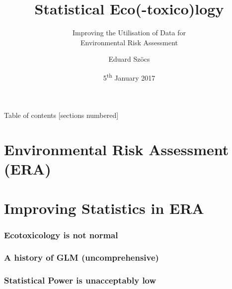 \documentclass[10pt
	]{beamer}
\title{Statistical Eco(-toxico)logy}
\subtitle{Improving the Utilisation of Data for\\Environmental Risk Assessment}
\date{5\textsuperscript{th} January 2017}
\author{Eduard Sz\"{o}cs}
\begin{document}
\maketitle

\begin{frame}{Table of contents}
  [sections numbered]
  \tableofcontents[hideallsubsections]
\end{frame}

\section{Environmental Risk Assessment (ERA)}


\section{Improving Statistics in ERA}


\begin{frame}
\frametitle{Ecotoxicology is not normal}

\end{frame}



\begin{frame}
\frametitle{A history of GLM (uncomprehensive)}

\end{frame}


\begin{frame}
\frametitle{Statistical Power is unacceptably low}

\end{frame}
\end{document}
